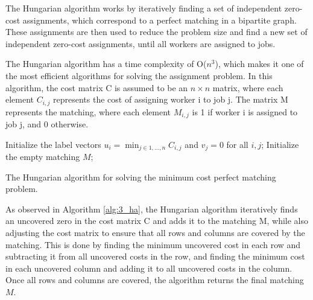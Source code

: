 The Hungarian algorithm works by iteratively finding a set of independent zero-cost assignments, which correspond to a perfect matching in a bipartite graph. These assignments are then used to reduce the problem size and find a new set of independent zero-cost assignments, until all workers are assigned to jobs.

The Hungarian algorithm has a time complexity of O($n^3$), which makes it one of the most efficient algorithms for solving the assignment problem. In this algorithm, the cost matrix C is assumed to be an $n \times n$ matrix, where each element $C_{i,j}$ represents the cost of assigning worker i to job j. The matrix M represents the matching, where each element $M_{i,j}$ is 1 if worker i is assigned to job j, and 0 otherwise.

\begin{algorithm}[]
	\SetAlgoLined
	\DontPrintSemicolon
	Initialize the label vectors $u_i = \min_{j\in{1,\dots,n}} C_{i,j}$ and $v_j=0$ for all $i,j$;
	Initialize the empty matching $M$;
	\caption{The Hungarian algorithm for solving the minimum cost perfect matching problem.}
	\label{alg:3_ha}
\end{algorithm}

As observed in Algorithm \ref{alg:3_ha}, the Hungarian algorithm iteratively finds an uncovered zero in the cost matrix C and adds it to the matching M, while also adjusting the cost matrix to ensure that all rows and columns are covered by the matching. This is done by finding the minimum uncovered cost in each row and subtracting it from all uncovered costs in the row, and finding the minimum cost in each uncovered column and adding it to all uncovered costs in the column. Once all rows and columns are covered, the algorithm returns the final matching $M$.

